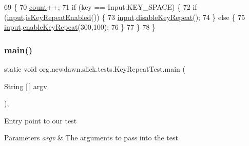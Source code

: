 \begin{DoxyCode}
69                                             \{
70         \mbox{\hyperlink{classorg_1_1newdawn_1_1slick_1_1tests_1_1_key_repeat_test_a907835f32f42f9cf166da563119cff0b}{count}}++;
71         \textcolor{keywordflow}{if} (key == Input.KEY\_SPACE) \{
72             \textcolor{keywordflow}{if} (\mbox{\hyperlink{classorg_1_1newdawn_1_1slick_1_1tests_1_1_key_repeat_test_ae6cb084c8595eb389b674bce147bd4ea}{input}}.\mbox{\hyperlink{classorg_1_1newdawn_1_1slick_1_1_input_a81051ce61287d26d30ee47a0af2a08eb}{isKeyRepeatEnabled}}()) \{
73                 \mbox{\hyperlink{classorg_1_1newdawn_1_1slick_1_1tests_1_1_key_repeat_test_ae6cb084c8595eb389b674bce147bd4ea}{input}}.\mbox{\hyperlink{classorg_1_1newdawn_1_1slick_1_1_input_ae223c9d3e3cbc220ffb0566f5ea19f2f}{disableKeyRepeat}}();
74             \} \textcolor{keywordflow}{else} \{
75                 \mbox{\hyperlink{classorg_1_1newdawn_1_1slick_1_1tests_1_1_key_repeat_test_ae6cb084c8595eb389b674bce147bd4ea}{input}}.\mbox{\hyperlink{classorg_1_1newdawn_1_1slick_1_1_input_a949805ba38338134d88e0082d10a29ed}{enableKeyRepeat}}(300,100);
76             \}
77         \}
78     \}
\end{DoxyCode}
\mbox{\label{classorg_1_1newdawn_1_1slick_1_1tests_1_1_key_repeat_test_acdaa80172b8d571548a1c5e9d170465e}} 
\subsubsection{\texorpdfstring{main()}{main()}}
{\footnotesize\ttfamily static void org.\+newdawn.\+slick.\+tests.\+Key\+Repeat\+Test.\+main (\begin{DoxyParamCaption}\item[{String \mbox{[}$\,$\mbox{]}}]{argv }\end{DoxyParamCaption})\hspace{0.3cm}{\ttfamily [inline]}, {\ttfamily [static]}}

Entry point to our test


\begin{DoxyParams}{Parameters}
{\em argv} & The arguments to pass into the test \\
\hline
\end{DoxyParams}

